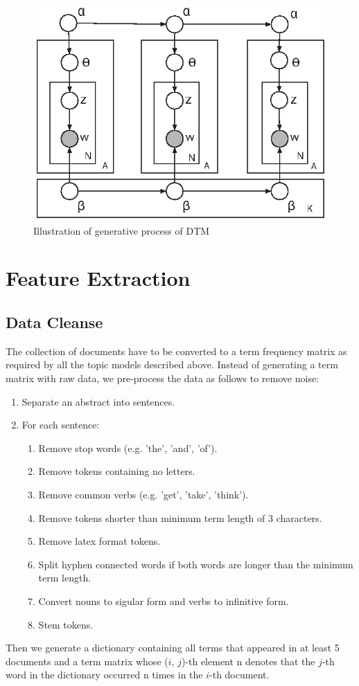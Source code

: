 \documentclass[DIV=calc, paper=letter, fontsize=10pt, twocolumn]{scrartcl}	 %
\begin{document}
\begin{figure}[!ht]
				\centerline{\includegraphics[scale = 0.8]{p113-blei.eps}}
				\caption{Illustration of generative process of DTM \cite{3}}
				\label{fig: DTM}
			\end{figure}

\section*{Feature Extraction}
\subsection*{Data Cleanse}
The collection of documents have to be converted to a term frequency matrix as required by all the topic models described above. Instead of generating a term matrix with raw data, we pre-process the data as follows to remove noise:
\begin{enumerate}
  \item Separate an abstract into sentences.
  \item For each sentence:
    	\begin{enumerate}
  	  	\item Remove stop words (e.g. 'the', 'and', 'of').
		\item Remove tokens containing no letters.
		\item Remove common verbs (e.g. 'get', 'take', 'think').
		\item Remove tokens shorter than minimum term length of 3 characters.
		\item Remove latex format tokens.
		\item Split hyphen connected words if both words are longer than the minimum term length.
		\item Convert nouns to sigular form and verbs to infinitive form.
		\item Stem tokens.
  	\end{enumerate}
\end{enumerate}
Then we generate a dictionary containing all terms that appeared in at least 5 documents and a term matrix whose ($i$, $j$)-th element n denotes that the $j$-th word in the dictionary occurred n times in the $i$-th document.
 
\end{document}
